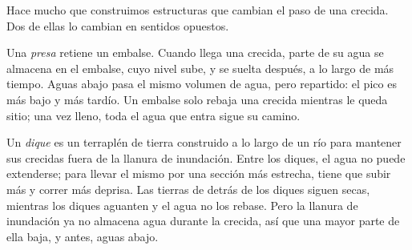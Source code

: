 Hace mucho que construimos estructuras que cambian el paso de una crecida.
Dos de ellas lo cambian en sentidos opuestos.

Una \emph{presa} retiene un embalse. Cuando llega una crecida, parte de su
agua se almacena en el embalse, cuyo nivel sube, y se suelta después, a lo
largo de más tiempo. Aguas abajo pasa el mismo volumen de agua, pero
repartido: el pico es más bajo y más tardío. Un embalse solo rebaja una
crecida mientras le queda sitio; una vez lleno, toda el agua que entra sigue
su camino.

Un \emph{dique} es un terraplén de tierra construido a lo largo de un río
para mantener sus crecidas fuera de la llanura de inundación. Entre los
diques, el agua no puede extenderse; para llevar el mismo  por una
sección más estrecha, tiene que subir más y correr más deprisa. Las tierras de
detrás de los diques siguen secas, mientras los diques aguanten y el agua no
los rebase. Pero la llanura de inundación ya no almacena agua durante la
crecida, así que una mayor parte de ella baja, y antes, aguas abajo.

